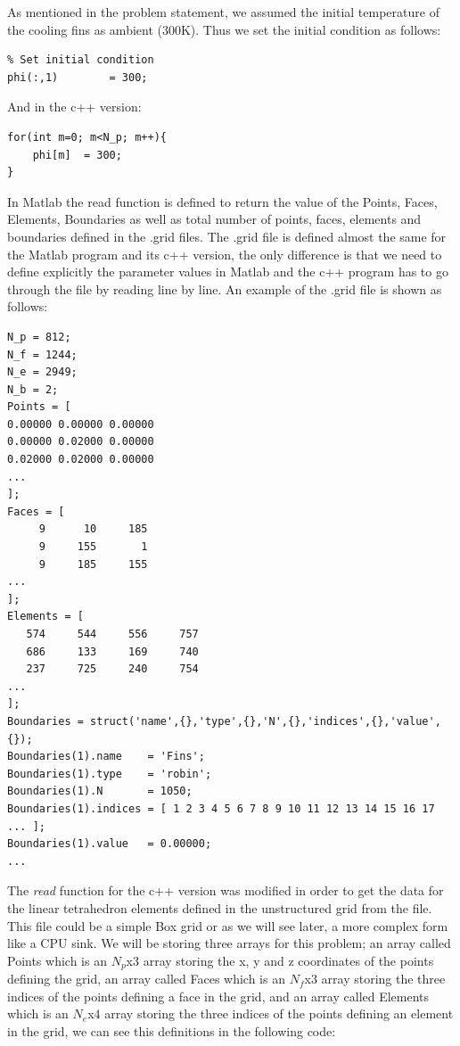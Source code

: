\documentclass[12pt]{article}
\begin{document}
As mentioned in the problem statement, we assumed the initial temperature of the cooling fins as ambient (300K). Thus we set the initial condition as follows:

\begin{lstlisting}
% Set initial condition
phi(:,1)        = 300;
\end{lstlisting}

And in the c++ version:

\begin{lstlisting}[style=MyC++Style]
for(int m=0; m<N_p; m++){
	phi[m]	= 300;
}
\end{lstlisting}

In Matlab the read function is defined to return the value of the Points, Faces, Elements, Boundaries as well as total number of points, faces, elements and boundaries defined in the .grid files.
The .grid file is defined almost the same for the Matlab program and its c++ version, the only difference is that we need to define explicitly the parameter values in Matlab and the c++ 
program has to go through the file by reading line by line. An example of the .grid file is shown as follows:

\begin{lstlisting}
N_p = 812;
N_f = 1244;
N_e = 2949;
N_b = 2;
Points = [
0.00000	0.00000	0.00000
0.00000	0.02000	0.00000
0.02000	0.02000	0.00000
...
];
Faces = [
     9	    10	   185
     9	   155	     1
     9	   185	   155
...
];
Elements = [
   574	   544	   556	   757
   686	   133	   169	   740
   237	   725	   240	   754
...
];
Boundaries = struct('name',{},'type',{},'N',{},'indices',{},'value',{});
Boundaries(1).name    = 'Fins';
Boundaries(1).type    = 'robin';
Boundaries(1).N       = 1050;
Boundaries(1).indices = [ 1 2 3 4 5 6 7 8 9 10 11 12 13 14 15 16 17 ... ];
Boundaries(1).value   = 0.00000;
...
\end{lstlisting}

The \textit{read} function for the c++ version was modified in order to get the data for the linear tetrahedron elements defined in the unstructured grid from the file. This file could be a simple Box grid or as we will see later, a more complex form like a CPU sink. We will be storing three arrays for this problem; an array called Points which is an $N_p$x$3$ array storing the x, y and z coordinates of the points defining the grid, an array called Faces which is an $N_f$x$3$ array storing the three indices of the points defining a face in the grid, and an array called Elements which is an $N_e$x$4$ array storing the three indices of the points defining an element in the grid, we can see this definitions in the following code:
\end{document}
